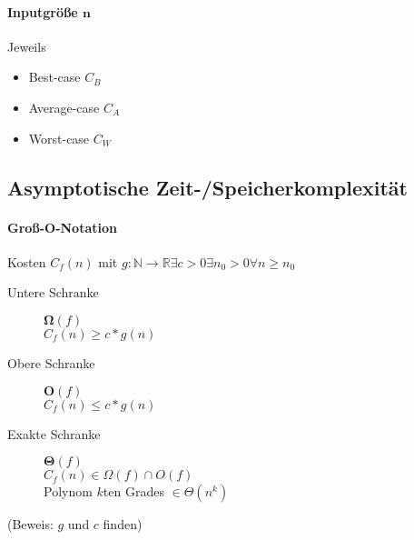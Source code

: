 \paragraph{Inputgrö\ss e $\mathbf{n}$} Jeweils

\begin{itemize}
  \item Best-case $C_B$

  \item Average-case $C_A$

  \item Worst-case $C_W$
\end{itemize}

\subsection{Asymptotische Zeit-/Speicherkomplexität}

\paragraph{Gro\ss-O-Notation}
Kosten $C_f(n)$ mit $g: \mathbb{N} \rightarrow \mathbb{R} \exists c > 0 \exists n_0 > 0 \forall n \geq n_0$

\begin{description}
  \item [Untere Schranke] $\boldsymbol{\Omega} (f)$ \\
        $C_f(n) \boldsymbol{\geq} c * g(n)$

  \item [Obere Schranke] $\boldsymbol{O}(f)$ \\
        $C_f(n) \boldsymbol{\leq} c * g(n)$

  \item [Exakte Schranke] $\boldsymbol{\Theta} (f)$ \\
        $C_f(n) \in \Omega (f) \cap O(f)$ \\
        Polynom $k$ten Grades $\in \Theta (n^k)$
\end{description}

(Beweis: $g$ und $c$ finden)

